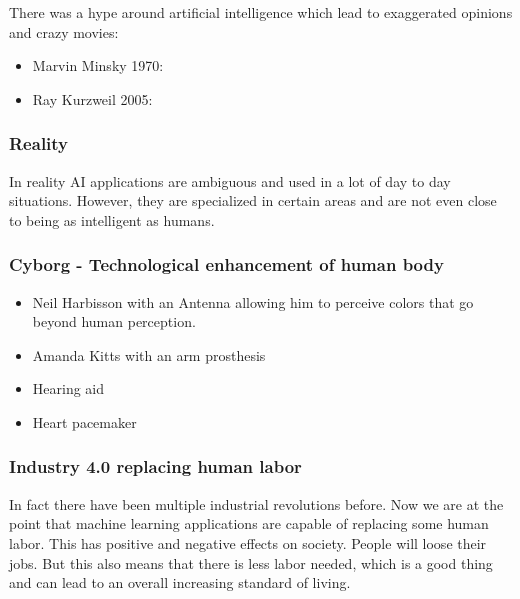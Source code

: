 There was a hype around artificial intelligence which lead to exaggerated opinions and crazy movies:

\begin{itemize}
    \item Marvin Minsky 1970: 
    \item Ray Kurzweil 2005: 
\end{itemize}

\subsubsection*{Reality}

In reality AI applications are ambiguous and used in a lot of day to day situations. However, they are specialized in certain areas and are not even close to being as intelligent as humans.

\subsubsection*{Cyborg - Technological enhancement of human body}

\begin{itemize}
    \item Neil Harbisson with an Antenna allowing him to perceive colors that go beyond human perception.
    \item Amanda Kitts with an arm prosthesis
    \item Hearing aid
    \item Heart pacemaker
\end{itemize}

\subsubsection*{Industry 4.0 replacing human labor}

In fact there have been multiple industrial revolutions before. Now we are at the point that machine learning applications are capable of replacing some human labor. This has positive and negative effects on society. People will loose their jobs. But this also means that there is less labor needed, which is a good thing and can lead to an overall increasing standard of living.

